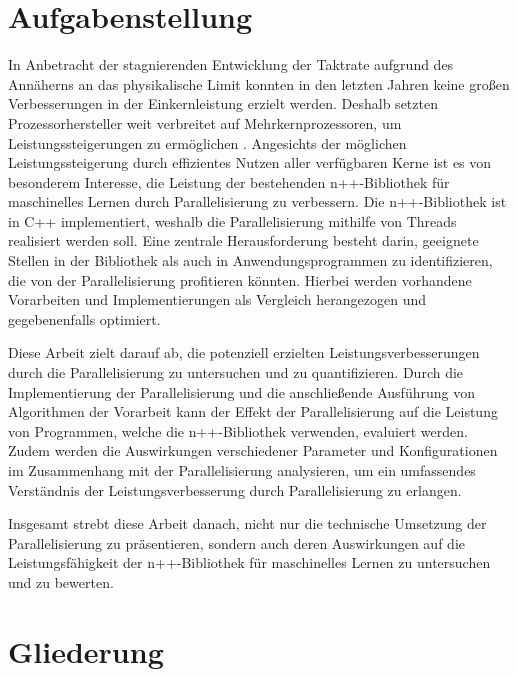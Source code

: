 \section{Aufgabenstellung}
\label{sec:Einleitung_Aufgabenstellung}
In Anbetracht der stagnierenden Entwicklung der Taktrate aufgrund des Annäherns an das physikalische Limit konnten in den letzten Jahren keine großen Verbesserungen in der Einkernleistung erzielt werden. Deshalb setzten Prozessorhersteller weit verbreitet auf Mehrkernprozessoren, um Leistungssteigerungen zu ermöglichen \citep{Chip_makers_turn_to_multicore}. Angesichts der möglichen Leistungssteigerung durch effizientes Nutzen aller verfügbaren Kerne ist es von besonderem Interesse, die Leistung der bestehenden n++-Bibliothek für maschinelles Lernen durch Parallelisierung zu verbessern. Die n++-Bibliothek ist in C++ implementiert, weshalb die Parallelisierung mithilfe von Threads realisiert werden soll. Eine zentrale Herausforderung besteht darin, geeignete Stellen in der Bibliothek als auch in Anwendungsprogrammen zu identifizieren, die von der Parallelisierung profitieren könnten. Hierbei werden vorhandene Vorarbeiten \citep{thesis_Artur_Brening} und Implementierungen als Vergleich herangezogen und gegebenenfalls optimiert.

Diese Arbeit zielt darauf ab, die potenziell erzielten Leistungsverbesserungen durch die Parallelisierung zu untersuchen und zu quantifizieren. Durch die Implementierung der Parallelisierung und die anschließende Ausführung von Algorithmen der Vorarbeit kann der Effekt der Parallelisierung auf die Leistung von Programmen, welche die n++-Bibliothek verwenden, evaluiert werden. Zudem werden die Auswirkungen verschiedener Parameter und Konfigurationen im Zusammenhang mit der Parallelisierung analysieren, um ein umfassendes Verständnis der Leistungsverbesserung durch Parallelisierung zu erlangen.

Insgesamt strebt diese Arbeit danach, nicht nur die technische Umsetzung der Parallelisierung zu präsentieren, sondern auch deren Auswirkungen auf die Leistungsfähigkeit der n++-Bibliothek für maschinelles Lernen zu untersuchen und zu bewerten.

\section{Gliederung}
\label{sec:Einleitung_Gliederung}






